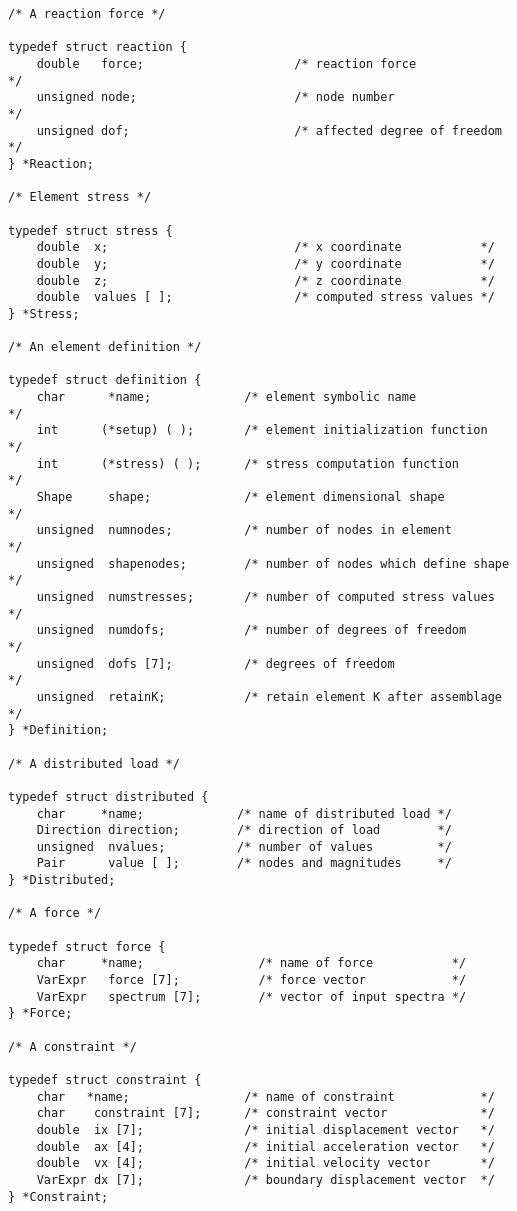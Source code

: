 {\small
\begin{screen}
 \begin{verbatim}
/* A reaction force */

typedef struct reaction {
    double   force;                     /* reaction force             */
    unsigned node;                      /* node number                */
    unsigned dof;                       /* affected degree of freedom */
} *Reaction;

/* Element stress */

typedef struct stress {
    double  x;                          /* x coordinate           */
    double  y;                          /* y coordinate           */
    double  z;                          /* z coordinate           */
    double  values [ ];                 /* computed stress values */
} *Stress;

/* An element definition */

typedef struct definition {
    char      *name;             /* element symbolic name              */
    int      (*setup) ( );       /* element initialization function    */ 
    int      (*stress) ( );      /* stress computation function        */
    Shape     shape;             /* element dimensional shape          */
    unsigned  numnodes;          /* number of nodes in element         */
    unsigned  shapenodes;        /* number of nodes which define shape */
    unsigned  numstresses;       /* number of computed stress values   */
    unsigned  numdofs;           /* number of degrees of freedom       */
    unsigned  dofs [7];          /* degrees of freedom                 */
    unsigned  retainK;           /* retain element K after assemblage  */
} *Definition;

/* A distributed load */

typedef struct distributed {
    char     *name;             /* name of distributed load */
    Direction direction;        /* direction of load        */
    unsigned  nvalues;          /* number of values         */
    Pair      value [ ];        /* nodes and magnitudes     */
} *Distributed;

/* A force */

typedef struct force {
    char     *name;                /* name of force           */
    VarExpr   force [7];           /* force vector            */
    VarExpr   spectrum [7];        /* vector of input spectra */ 
} *Force;

/* A constraint */

typedef struct constraint {
    char   *name;                /* name of constraint            */
    char    constraint [7];      /* constraint vector             */
    double  ix [7];              /* initial displacement vector   */
    double  ax [4];              /* initial acceleration vector   */
    double  vx [4];              /* initial velocity vector       */
    VarExpr dx [7];              /* boundary displacement vector  */
} *Constraint;


\end{verbatim}
\end{screen}}
